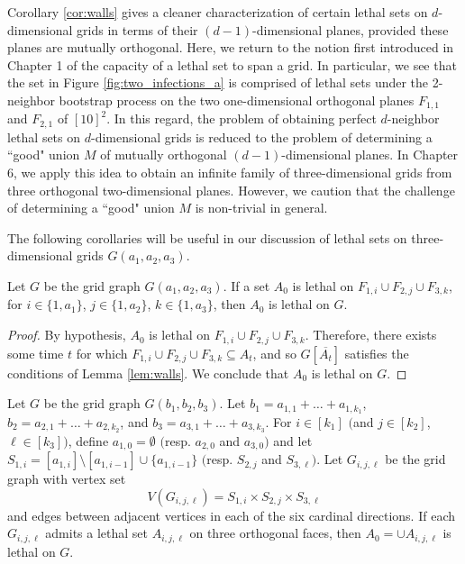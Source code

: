 Corollary \ref{cor:walls} gives a cleaner characterization of certain lethal sets on $d$-dimensional grids in terms of their $(d-1)$-dimensional planes, provided these planes are mutually orthogonal. Here, we return to the notion first introduced in Chapter 1 of the capacity of a lethal set to span a grid. In particular, we see that the set in Figure \ref{fig:two_infections_a} is comprised of lethal sets under the 2-neighbor bootstrap process on the two one-dimensional orthogonal planes $F_{1,1}$ and $F_{2,1}$ of $[10]^2$. In this regard, the problem of obtaining perfect $d$-neighbor lethal sets on $d$-dimensional grids is reduced to the problem of determining a ``good" union $M$ of mutually orthogonal $(d-1)$-dimensional planes. 
In Chapter 6, we apply this idea to obtain an infinite family of three-dimensional grids from three orthogonal two-dimensional planes. However, we caution that the challenge of determining a ``good" union $M$ is non-trivial in general.

The following corollaries will be useful in our discussion of lethal sets on three-dimensional grids $G(a_1,a_2,a_3)$. 

\begin{cor}
\label{cor:three_walls_simple}
Let $G$ be the grid graph $G(a_1,a_2,a_3)$. If a set $A_0$ is lethal on $F_{1,i} \cup F_{2,j} \cup F_{3,k}$, for $i \in \{1,a_1\}$, $j \in \{1,a_2\}$, $k \in \{1,a_3\}$, then $A_0$ is lethal on $G$.
\end{cor}

\begin{proof}
By hypothesis, $A_0$ is lethal on $F_{1,i} \cup F_{2,j} \cup F_{3,k}$. Therefore, there exists some time $t$ for which $F_{1,i} \cup F_{2,j} \cup F_{3,k} \subseteq A_t$, and so $G[\overline{A_t}]$ satisfies the conditions of Lemma \ref{lem:walls}. We conclude that $A_0$ is lethal on $G$.
\end{proof}

\begin{cor}
\label{cor:three_walls}
Let $G$ be the grid graph $G(b_1,b_2,b_3)$. Let $b_1 = a_{1,1} + \dots + a_{1,k_1}$, $b_2 = a_{2,1} + \dots + a_{2,k_2}$, and $b_3 = a_{3,1} + \dots + a_{3,k_3}$. For $i \in [k_1]$ $($and $j \in [k_2]$, $\ell \in [k_3]$$)$, define $a_{1,0} = \emptyset$ $($resp. $a_{2,0}$ and $a_{3,0}$$)$ and let $S_{1,i} = [a_{1,i}] \setminus [a_{1,i-1}] \cup \{a_{1,i-1}\}$ $($resp. $S_{2,j}$ and $S_{3,\ell}$$)$. Let $G_{i,j,\ell}$ be the grid graph with vertex set
$$V(G_{i,j,\ell}) = S_{1,i} \times S_{2,j} \times S_{3,\ell}$$
and edges between adjacent vertices in each of the six cardinal directions. If each $G_{i,j,\ell}$ admits a lethal set $A_{i,j,\ell}$ on three orthogonal faces, then $A_0 = \cup A_{i,j,\ell}$ is lethal on $G$.
\end{cor}

